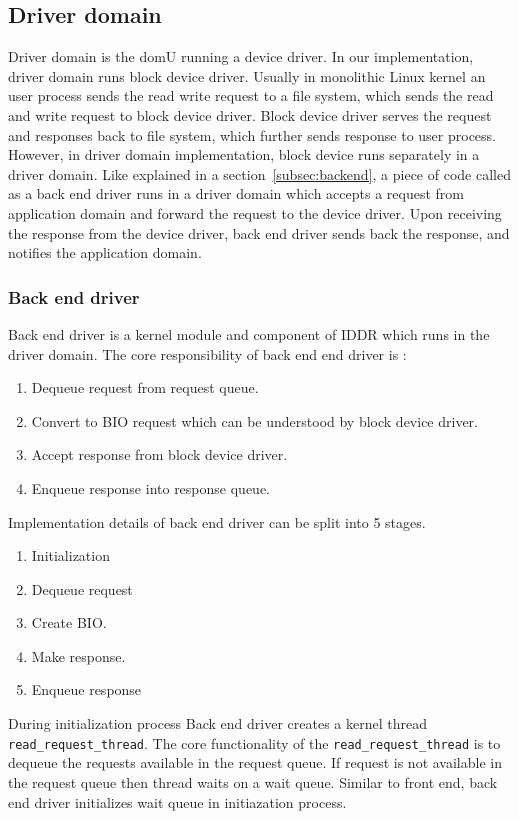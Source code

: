 \subsection{Driver domain}

Driver domain is the domU running a device driver. In our implementation, driver domain runs block device driver. Usually in monolithic Linux kernel an user process sends the read write request to a file system, which sends the read and write request to block device driver. Block device driver serves the request and responses back to file system, which further sends response to user process.
\\  
However, in driver domain implementation, block device runs separately in a driver domain. Like explained in a section~\ref{subsec:backend}, a piece of code called as a back end driver runs in a driver domain which accepts a request from application domain and forward the request to the device driver. Upon receiving the response from the device driver, back end driver sends back the response, and notifies the application domain.

\subsubsection*{Back end driver}

Back end driver is a kernel module and component of IDDR which runs in the driver domain. The core responsibility of back end end driver is :
\begin{enumerate}
\item Dequeue request from request queue.
\item Convert to BIO request which can be understood by block device driver.
\item Accept response from block device driver.
\item Enqueue response into response queue.
\end{enumerate}
Implementation details of back end driver can be split into 5 stages. 
\begin{enumerate}
\item Initialization
\item Dequeue request
\item Create BIO. 
\item Make response.
\item Enqueue response
\end{enumerate}

During initialization process Back end driver creates a kernel thread \texttt{read\_request\_thread}. The core functionality of the \texttt{read\_request\_thread} is to dequeue the requests available in the request queue. If request is not available in the request queue then thread waits on a wait queue. Similar to front end, back end driver initializes wait queue in initiazation process. 

